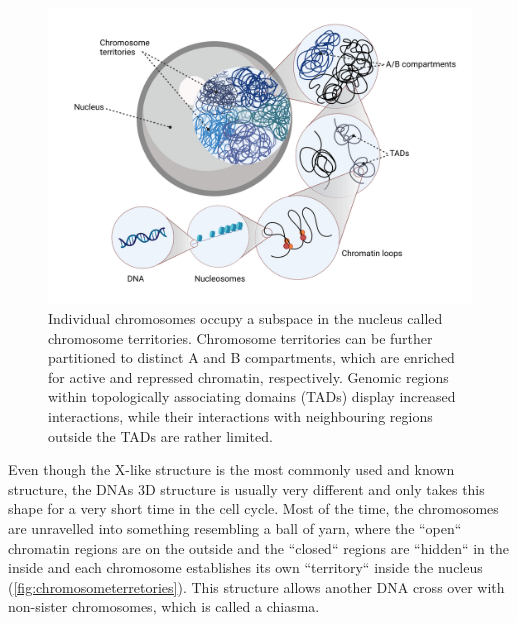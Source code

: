 \begin{figure}[!ht]
\centering
\includegraphics[width=0.9\linewidth]{Figures/intro/ChromosomeTerritories}
\caption[Overview DNA structure]{Individual chromosomes occupy a subspace in the nucleus called chromosome territories. Chromosome territories can be further partitioned to distinct A and B compartments, which are enriched for active and repressed chromatin, respectively. Genomic regions within topologically associating domains (TADs) display increased interactions, while their interactions with neighbouring regions outside the TADs are rather limited.}\label{fig:chromosometerretories}
\end{figure}

Even though the X-like structure is the most commonly used and known structure, the DNAs 3D structure is usually very different and only takes this shape for a very short time in the cell cycle. Most of the time, the chromosomes are unravelled into something resembling a ball of yarn, where the ``open`` chromatin regions are on the outside and the ``closed`` regions are ``hidden`` in the inside and each chromosome establishes its own ``territory`` inside the nucleus (\autoref{fig:chromosometerretories}). This structure allows another DNA cross over with non-sister chromosomes, which is called a chiasma.

